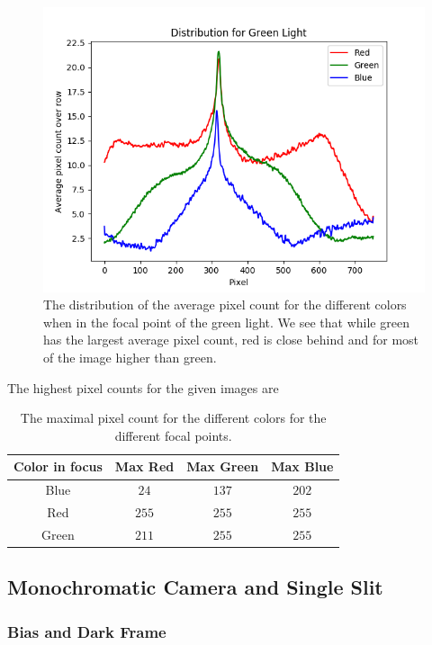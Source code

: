 \documentclass{emulateapj}
\begin{document}
\begin{figure}[H]
\centering
\includegraphics[scale=0.3]{greenDist.png}
\caption{The distribution of the average pixel count for the different colors when in the focal point of the green light. We see that while green has the largest average pixel count, red is close behind and for most of the image higher than green.}
\label{img:green}
\end{figure}

The highest pixel counts for the given images are

\begin{table}[H]
\centering
\begin{tabular}{c | c | c | c}
Color in focus & Max Red & Max Green &Max Blue \\
\hline
Blue & $24$ & $137$ & $202$\\
Red & $255$ & $255$ & $255$\\
Green & $211$ & $255$ & $255$
\end{tabular}
\caption{The maximal pixel count for the different colors for the different focal points.}
\label{tab:colorMaxMin}
\end{table}




\subsection{Monochromatic Camera and Single Slit}
\label{sec:redMono}

\subsubsection{Bias and Dark Frame}
\label{sec:biasDark}
\end{document}
